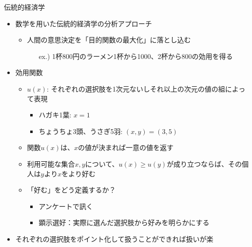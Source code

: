 \documentclass[dvipdfmx,11pt]{beamer}
\begin{document}
\begin{frame}{伝統的経済学}
  \begin{itemize}
    \item 数学を用いた伝統的経済学の分析アプローチ
    \begin{itemize}
      \item 人間の意思決定を「目的関数の最大化」に落とし込む
      \begin{itemize}
        \item[ex.)] 1杯800円のラーメン1杯から1000、2杯から800の効用を得る
      \end{itemize}
    \end{itemize}
    \item 効用関数
    \begin{itemize}
      \item $u(x)$: それぞれの選択肢を1次元ないしそれ以上の次元の値の組によって表現
      \begin{itemize}
        \item ハガキ1葉: $x = 1$
        \item ちょうちょ3頭、うさぎ5羽: $(x, y) = (3, 5)$
      \end{itemize}
      \item 関数$u(x)$は、$x$の値が決まれば一意の値を返す
      \item 利用可能な集合$x, y$について、$u(x) \geq u(y)$が成り立つならば、その個人は$y$より$x$をより好む
      \item「好む」をどう定義するか？
      \begin{itemize}
        \item アンケートで訊く
        \item 顕示選好：実際に選んだ選択肢から好みを明らかにする
      \end{itemize} 
    \end{itemize}
    \item それぞれの選択肢をポイント化して扱うことができれば扱いが楽
  \end{itemize}
\end{frame}
\end{document}
